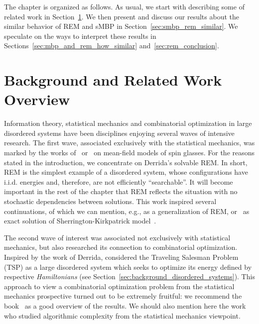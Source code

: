 The chapter is organized as follows. As usual, we start with describing some of
related work in Section~\ref{sec:smbp_rem_related_work}. We then present and
discuss our results about the similar behavior of REM and sMBP in
Section~\ref{sec:smbp_rem_similar}. We speculate on the ways to interpret these
results in Sections~\ref{sec:mbp_and_rem_how_similar}
and~\ref{sec:rem_conclusion}.


\section{Background and Related Work Overview}
\label{sec:smbp_rem_related_work}

Information theory, statistical mechanics and combinatorial optimization in
large disordered systems have been disciplines enjoying several waves of
intensive research. The first wave, associated exclusively with the statistical
mechanics, was marked by the works of~\citet{sk75spinb} or~\citet{derrida81} on
mean-field models of spin glasses. For the reasons stated in the introduction,
we concentrate on Derrida's solvable REM. In short, REM is the simplest
example of a disordered system, whose configurations have i.i.d. energies and,
therefore, are not efficiently ``searchable''. It will become important in the
rest of the chapter that REM reflects the situation with no stochastic
dependencies between solutions. This work inspired several continuations, of
which we can mention, e.g., \citep{derrida86} as a generalization of REM,
or~\citep{Aizenman1987} as exact solution of Sherrington-Kirkpatrick
model~\citep{sk75spin}.

The second wave of interest was associated not exclusively with statistical
mechanics, but also researched its connection to combinatorial optimization.
Inspired by the work of Derrida, \citet{mezard84tsp} considered the Traveling
Salesman Problem (TSP) as a large disordered system which seeks to optimize its
energy defined by respective \textit{Hamiltonians} (see
Section~\ref{sec:background_disordered_systems}). This approach to view a
combinatorial optimization problem from the statistical mechanics prospective
turned out to be extremely fruitful: we recommend the book~\citep{LUCZAK1994} as
a good overview of the results. We should also mention here the
work~\citep{Auffinger2014} who studied algorithmic complexity from the
statistical mechanics viewpoint.

